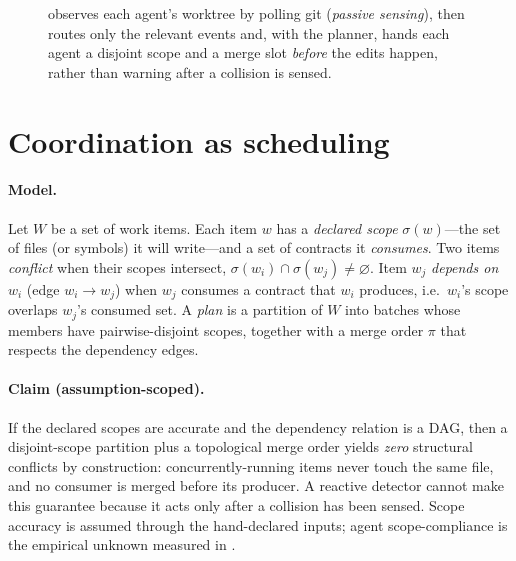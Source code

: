 \begin{figure}[t]
{}
\caption{\sysname observes each agent's worktree by polling git (\emph{passive sensing}), then
routes only the relevant events and, with the planner, hands each agent a disjoint scope and a
merge slot \emph{before} the edits happen, rather than warning after a collision is sensed.}
\label{fig:arch}
\end{figure}

\section{Coordination as scheduling}
\label{sec:planner}

\paragraph{Model.} Let $W$ be a set of work items. Each item $w$ has a \emph{declared scope}
$\sigma(w)$---the set of files (or symbols) it will write---and a set of contracts it
\emph{consumes}. Two items \emph{conflict} when their scopes intersect,
$\sigma(w_i)\cap\sigma(w_j)\neq\varnothing$. Item $w_j$ \emph{depends on} $w_i$ (edge
$w_i\!\rightarrow\!w_j$) when $w_j$ consumes a contract that $w_i$ produces, i.e.\ $w_i$'s scope
overlaps $w_j$'s consumed set. A \emph{plan} is a partition of $W$ into batches whose members have
pairwise-disjoint scopes, together with a merge order $\pi$ that respects the dependency edges.

\paragraph{Claim (assumption-scoped).} If the declared scopes are accurate and the dependency
relation is a DAG, then a disjoint-scope partition plus a topological merge order yields
\emph{zero} structural conflicts by construction: concurrently-running items never touch the same
file, and no consumer is merged before its producer. A reactive detector cannot make this guarantee
because it acts only after a collision has been sensed. Scope accuracy is assumed through the
hand-declared inputs; agent scope-compliance is the empirical unknown measured in
.

